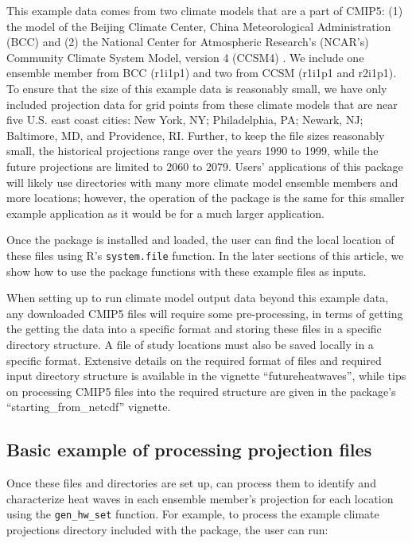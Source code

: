 This example data comes from two climate models that are a part of
CMIP5: (1) the model of the Beijing Climate Center, China Meteorological
Administration (BCC) \citep{xin2013introduction} and (2) the National
Center for Atmospheric Research's (NCAR's) Community Climate System
Model, version 4 (CCSM4) \citep{gent2011community}. We include one
ensemble member from BCC (r1i1p1) and two from CCSM (r1i1p1 and r2i1p1).
To ensure that the size of this example data is reasonably small, we
have only included projection data for grid points from these climate
models that are near five U.S. east coast cities: New York, NY;
Philadelphia, PA; Newark, NJ; Baltimore, MD, and Providence, RI.
Further, to keep the file sizes reasonably small, the historical
projections range over the years 1990 to 1999, while the future
projections are limited to 2060 to 2079. Users' applications of this
package will likely use directories with many more climate model
ensemble members and more locations; however, the operation of the
package is the same for this smaller example application as it would be
for a much larger application.

Once the  package is installed and loaded, the user
can find the local location of these files using R's
\texttt{system.file} function. In the later sections of this article, we
show how to use the package functions with these example files as
inputs.

When setting up to run climate model output data beyond this example
data, any downloaded CMIP5 files will require some pre-processing, in
terms of getting the getting the data into a specific format and storing
these files in a specific directory structure. A file of study locations
must also be saved locally in a specific format. Extensive details on
the required format of files and required input directory structure is
available in the  vignette ``futureheatwaves'',
while tips on processing CMIP5 files into the required structure are
given in the package's ``starting\_from\_netcdf'' vignette.

\subsection{Basic example of processing projection
files}\label{basic-example-of-processing-projection-files}

Once these files and directories are set up,  can
process them to identify and characterize heat waves in each ensemble
member's projection for each location using the \texttt{gen\_hw\_set}
function. For example, to process the example climate projections
directory included with the package, the user can run:

